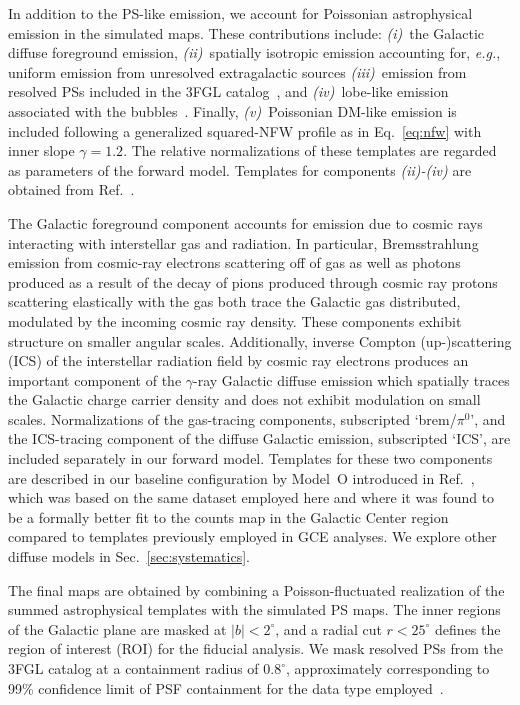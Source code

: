 \documentclass[prd,aps,10pt,nofootinbib,twocolumn,superscriptaddress,preprintnumbers,balancelastpage,longbibliography]{revtex4-1}
\begin{document}
In addition to the PS-like emission, we account for Poissonian astrophysical emission in the simulated maps.  These contributions include: \emph{(i)}~the Galactic diffuse foreground emission, \emph{(ii)}~spatially isotropic emission accounting for, \emph{e.g.}, uniform emission from unresolved extragalactic sources \emph{(iii)}~emission from resolved PSs included in the \Fermi 3FGL catalog~\cite{Fermi-LAT:2015bhf}, and \emph{(iv)}~lobe-like emission associated with the \Fermi bubbles~\cite{Su:2010qj}. Finally, \emph{(v)}~Poissonian DM-like emission is included following a generalized squared-NFW profile as in Eq.~\eqref{eq:nfw} with inner slope $\gamma=1.2$. The relative normalizations of these templates are regarded as parameters of the forward model. Templates for components \emph{(ii)-(iv)} are obtained from Ref.~\cite{rodd_nicholas_safdi_siddharth_2016}. 

The Galactic foreground component accounts for emission due to cosmic rays interacting with interstellar gas and radiation. In particular, Bremsstrahlung emission from cosmic-ray electrons scattering off of gas as well as photons produced as a result of the decay of pions produced through cosmic ray protons scattering elastically with the gas both trace the Galactic gas distributed, modulated by the incoming cosmic ray density. These components exhibit structure on smaller angular scales. Additionally, inverse Compton (up-)scattering (ICS) of the interstellar radiation field by cosmic ray electrons produces an important component of the $\gamma$-ray Galactic diffuse emission which spatially traces the Galactic charge carrier density and does not exhibit modulation on small scales. Normalizations of the gas-tracing components, subscripted `brem/$\pi^0$', and the ICS-tracing component of the diffuse Galactic emission, subscripted `ICS', are included separately in our forward model. Templates for these two components are described in our baseline configuration by {Model~O} introduced in Ref.~\cite{Buschmann:2020adf}, which was based on the same \Fermi dataset employed here and where it was found to be a formally better fit to the counts map in the Galactic Center region compared to templates previously employed in GCE analyses. We explore other diffuse models in Sec.~\ref{sec:systematics}. 

The final maps are obtained by combining a Poisson-fluctuated realization of the summed astrophysical templates with the simulated PS maps. The inner regions of the Galactic plane are masked at $|b| < 2^\circ$, and a radial cut $r < 25^\circ$ defines the region of interest (ROI) for the fiducial analysis. We mask resolved PSs from the 3FGL catalog at a containment radius of $0.8^\circ$, approximately corresponding to 99\% confidence limit of PSF containment for the data type employed~\cite{Fermi-LAT:2015bhf}.
\end{document}
